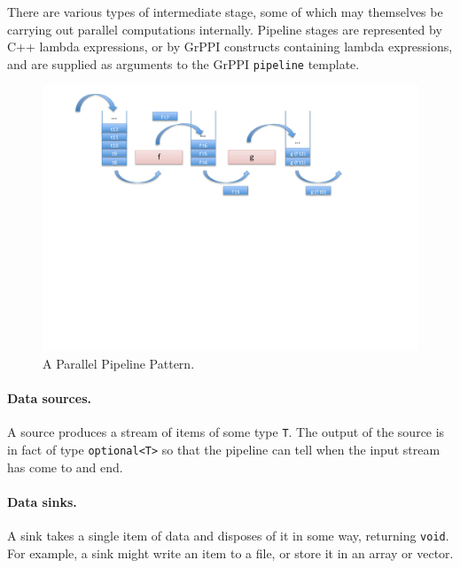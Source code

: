 There are various types of
intermediate stage, some of which may themselves be carrying out
parallel computations internally.  Pipeline stages are represented by C++
lambda expressions, or by GrPPI constructs containing lambda expressions,
and are supplied as arguments to the GrPPI \texttt{pipeline} template.

\begin{figure}[!ht]
\includegraphics[width=12cm]{figures/pipeline.pdf}

\caption{A Parallel Pipeline Pattern.}
\label{pipeline1}
\end{figure}


\paragraph{Data sources.}  A source produces a stream of items of some type \verb|T|.
The output of the source is in fact of type \verb|optional<T>| so
that the pipeline can tell when the input stream has come to and
end.


\paragraph{Data sinks.}
A sink takes a single item of data and disposes of it in some way, returning \verb|void|.
For example, a sink might write an item to a file, or store it in an array or vector.

